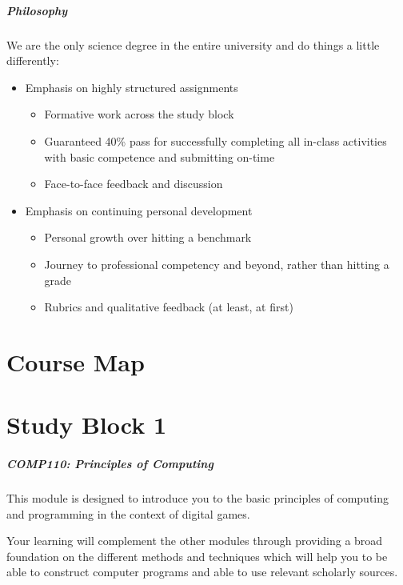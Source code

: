 \begin{frame}
	\frametitle{Philosophy}
	
	We are the only science degree in the entire university and do things a little differently:

	\begin{itemize}
		\item Emphasis on highly structured assignments 
		\begin{itemize}
			\item Formative work across the study block
			\item Guaranteed 40\% pass for successfully completing all in-class activities with basic competence and submitting on-time
			\item Face-to-face feedback and discussion			
		\end{itemize}
		\pause\item Emphasis on continuing personal development
		\begin{itemize}
			\item Personal growth over hitting a benchmark
			\item Journey to professional competency and beyond, rather than hitting a grade
			\item Rubrics and qualitative feedback (at least, at first)			
		\end{itemize}
	\end{itemize}
\end{frame}

\part{Course Map}
\frame{\partpage}




\part{Study Block 1}
\frame{\partpage}

\begin{frame}
	\frametitle{\Large{COMP110: Principles of Computing}}
	
	This module is designed to introduce you to the basic principles of computing and programming in the context of digital games.
	
	\vspace{2em}
	
	Your learning will complement the other modules through providing a broad foundation on the different methods and techniques which will help you to be able to construct computer programs and able to use relevant scholarly sources. 

\end{frame}


